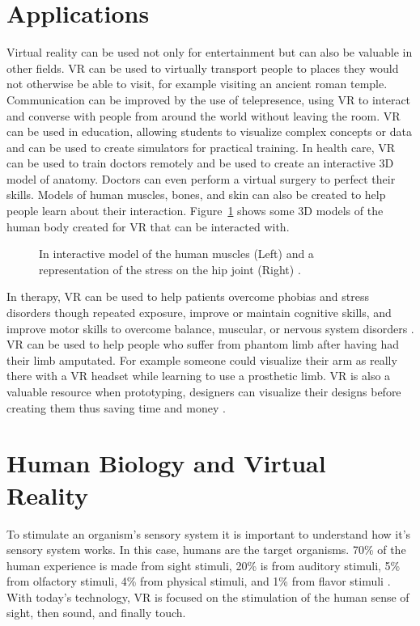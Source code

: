 \section{Applications}
Virtual reality can be used not only for entertainment but can also be valuable in other fields. VR can be used to virtually transport people to places they would not otherwise be able to visit, for example visiting an ancient roman temple. Communication can be improved by the use of telepresence, using VR to interact and converse with people from around the world without leaving the room. VR can be used in education, allowing students to visualize complex concepts or data and can be used to create simulators for practical training. In health care, VR can be used to train doctors remotely and be used to create an interactive 3D model of anatomy. Doctors can even perform a virtual surgery to perfect their skills. Models of human muscles, bones, and skin can also be created to help people learn about their interaction. Figure~\ref{fig:HumanModel} shows some 3D models of the human body created for VR that can be interacted with.  
\begin{figure}[!ht]
	\begin{center}
	\end{center}
	\caption{In interactive model of the human muscles (Left) and a representation of the stress on the hip joint (Right) \cite{GutierrezA.2008}.} \label{fig:HumanModel}
\end{figure}In therapy, VR can be used to help patients overcome phobias and stress disorders though repeated exposure, improve or maintain cognitive skills, and improve motor skills to overcome balance, muscular, or nervous system disorders \cite{LaValle2017}. VR can be used to help people who suffer from phantom limb after having had their limb amputated. For example someone could visualize their arm as really there with a VR headset while learning to use a prosthetic limb. VR is also a valuable resource when prototyping, designers can visualize their designs before creating them thus saving time and money \cite{LaValle2017}. 

\section{Human Biology and Virtual Reality}

To stimulate an organism's sensory system it is important to understand how it's sensory system works. In this case, humans are the target organisms. 70\% of the human experience is made from sight stimuli, 20\% is from auditory stimuli, 5\% from olfactory stimuli, 4\% from physical stimuli, and 1\% from flavor stimuli \cite{Mazuryk}. With today's technology, VR is focused on the stimulation of the human sense of sight, then sound, and finally touch. 


